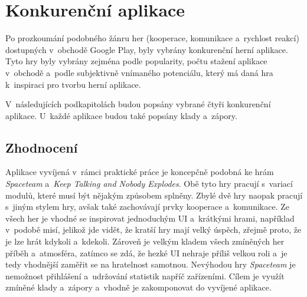 \chapter{Konkurenční aplikace}
\label{chap:competitive-apps}

Po prozkoumání podobného žánru her
(kooperace, komunikace a~rychlost reakcí)
dostupných v~obchodě Google Play,
byly vybrány konkurenční herní aplikace.
Tyto hry byly vybrány zejména podle popularity,
počtu stažení aplikace v~obchodě
a~podle subjektivně vnímaného potenciálu,
který má daná hra k~inspiraci pro tvorbu herní aplikace.

V~následujících podkapitolách budou popsány vybrané čtyři konkurenční aplikace.
U~každé aplikace budou také popsány klady a~zápory.






\section{Zhodnocení}

Aplikace vyvíjená v~rámci praktické práce je koncepčně podobná ke hrám
\emph{Spaceteam} a~\emph{Keep Talking and Nobody Explodes}.
Obě tyto hry pracují s~variací modulů,
které musí být nějakým způsobem splněny.
Zbylé dvě hry naopak pracují s~jiným stylem hry,
avšak také zachovávají prvky kooperace a~komunikace.
Ze všech her je vhodné se inspirovat jednoduchým UI a~krátkými hrami,
například v~podobě misí,
jelikož jde vidět,
že kratší hry mají velký úspěch,
zřejmě proto,
že je lze hrát kdykoli a~kdekoli.
Zároveň je velkým kladem všech zmíněných her příběh a~atmosféra,
zatímco se zdá,
že hezké UI nehraje příliš velkou roli
a~je tedy vhodnější zaměřit se na hratelnost samotnou.
Nevýhodou hry \emph{Spaceteam} je nemožnost přihlášení a~udržování statistik
napříč zařízeními.
Cílem je využít zmíněné klady a~zápory a~vhodně je zakomponovat do vyvíjené
aplikace.
